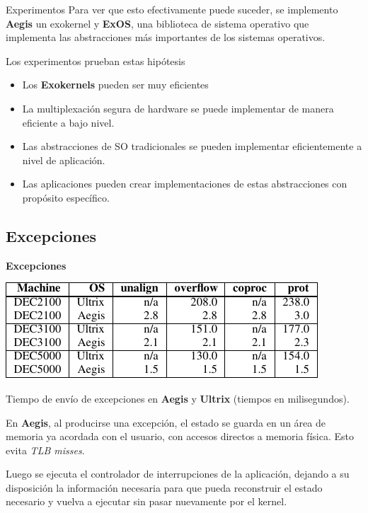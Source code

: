 \documentclass[10pt]{beamer}
\begin{document}
\begin{frame}{Experimentos}
Para ver que esto efectivamente puede suceder, se implemento \textbf{Aegis} un exokernel y \textbf{ExOS}, una biblioteca de sistema operativo que implementa las abstracciones más importantes de los sistemas operativos. 

Los experimentos prueban estas hipótesis

\begin{itemize}
  \item Los \textbf{Exokernels} pueden ser muy eficientes
  \item La multiplexación segura de hardware se puede implementar de manera eficiente a bajo nivel.
  \item Las abstracciones de SO tradicionales se pueden implementar eficientemente a nivel de aplicación.
  \item Las aplicaciones pueden crear implementaciones de estas abstracciones con propósito específico.
\end{itemize}
\end{frame}

\subsection{Excepciones}

\begin{frame}
\textbf{Excepciones}\\[2em]
\begin{table}
\includegraphics[scale=0.8]{grafico-excepciones.pdf}
\caption{Tiempo de envío de excepciones en \textbf{Aegis} y \textbf{Ultrix} (tiempos en milisegundos).}
\end{table}

En \textbf{Aegis}, al producirse una excepción, el estado se guarda en un área de memoria ya acordada con el usuario, con accesos directos a memoria física. Esto evita \emph{TLB misses}.

Luego se ejecuta el controlador de interrupciones de la aplicación, dejando a su disposición la información necesaria para que pueda reconstruir el estado necesario y vuelva a ejecutar sin pasar nuevamente por el kernel. 
\end{frame}
\end{document}
